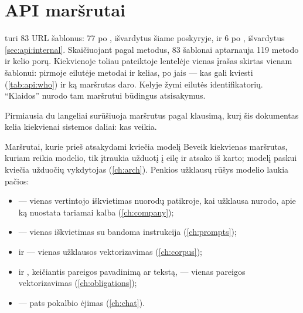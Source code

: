 \section{API maršrutai}\label{sec:api:routes}

 turi 83 URL šablonus: 77 po , išvardytus šiame poskyryje, ir 6 po
, išvardytus \cref{sec:api:internal}. Skaičiuojant pagal metodus, 83
šablonai aptarnauja 119 metodo ir kelio porų. Kiekvienoje toliau pateiktoje lentelėje vienas
įrašas skirtas vienam šablonui: pirmoje eilutėje metodai ir kelias, po jais --- kas gali kviesti
(\cref{tab:api:who}) ir ką maršrutas daro. Kelyje  žymi eilutės identifikatorių.
\enquote{Klaidos} nurodo tam maršrutui būdingus atsisakymus.

Pirmiausia du langeliai surūšiuoja maršrutus pagal klausimą, kurį šis dokumentas kelia
kiekvienai sistemos daliai: kas veikia.

\begin{aibox}{Maršrutai, kurie prieš atsakydami kviečia modelį}
Beveik kiekvienas maršrutas, kuriam reikia modelio, tik įtraukia užduotį į eilę ir atsako iš
karto; modelį paskui kviečia užduočių vykdytojas (\cref{ch:arch}). Penkios užklausų rūšys modelio
laukia pačios:
\begin{itemize}
  \item {} --- vienas vertintojo iškvietimas nuorodų
    patikroje, kai užklausa nurodo, apie ką nuostata tariamai kalba (\cref{ch:company});
  \item {} --- vienas iškvietimas su bandoma instrukcija
    (\cref{ch:prompts});
  \item {} ir  --- vienas
    užklausos vektorizavimas (\cref{ch:corpus});
  \item {} ir , keičiantis pareigos pavadinimą ar tekstą,
    --- vienas pareigos vektorizavimas (\cref{ch:obligations});
  \item {} --- pats pokalbio ėjimas (\cref{ch:chat}).
\end{itemize}
\end{aibox}

